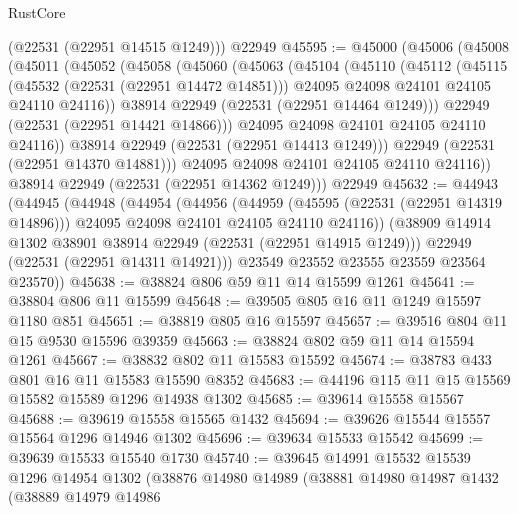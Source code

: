 \begin{lexlean}{RustCore}
\begin{coremodule}
      (@22531 (@22951 @14515 @1249)))
    @22949
@45595 := @45000
    (@45006
      (@45008
        (@45011
          (@45052
            (@45058
              (@45060
                (@45063
                  (@45104
                    (@45110
                      (@45112
                        (@45115
                          (@45532 (@22531 (@22951 @14472 @14851)))
                          @24095
                          @24098
                          @24101
                          @24105
                          @24110
                          @24116))
                      @38914
                      @22949
                      (@22531 (@22951 @14464 @1249)))
                    @22949
                    (@22531 (@22951 @14421 @14866)))
                  @24095
                  @24098
                  @24101
                  @24105
                  @24110
                  @24116))
              @38914
              @22949
              (@22531 (@22951 @14413 @1249)))
            @22949
            (@22531 (@22951 @14370 @14881)))
          @24095
          @24098
          @24101
          @24105
          @24110
          @24116))
      @38914
      @22949
      (@22531 (@22951 @14362 @1249)))
    @22949
@45632 := @44943
    (@44945
      (@44948
        (@44954
          (@44956
            (@44959
              (@45595 (@22531 (@22951 @14319 @14896)))
              @24095
              @24098
              @24101
              @24105
              @24110
              @24116))
          (@38909 @14914 @1302 @38901 @38914 @22949 (@22531 (@22951 @14915 @1249)))
          @22949
          (@22531 (@22951 @14311 @14921)))
        @23549
        @23552
        @23555
        @23559
        @23564
        @23570))
@45638 := @38824 @806 @59 @11 @14 @15599 @1261
@45641 := @38804 @806 @11 @15599
@45648 := @39505 @805 @16 @11 @1249 @15597 @1180 @851
@45651 := @38819 @805 @16 @15597
@45657 := @39516 @804 @11 @15 @9530 @15596 @39359
@45663 := @38824 @802 @59 @11 @14 @15594 @1261
@45667 := @38832 @802 @11 @15583 @15592
@45674 := @38783 @433 @801 @16 @11 @15583 @15590 @8352
@45683 := @44196 @115 @11 @15 @15569 @15582 @15589 @1296 @14938 @1302
@45685 := @39614 @15558 @15567
@45688 := @39619 @15558 @15565 @1432
@45694 := @39626 @15544 @15557 @15564 @1296 @14946 @1302
@45696 := @39634 @15533 @15542
@45699 := @39639 @15533 @15540 @1730
@45740 := @39645
    @14991
    @15532
    @15539
    @1296
    @14954
    @1302
    (@38876
      @14980
      @14989
      (@38881
        @14980
        @14987
        @1432
        (@38889
          @14979
          @14986

\end{coremodule}
\end{lexlean}
